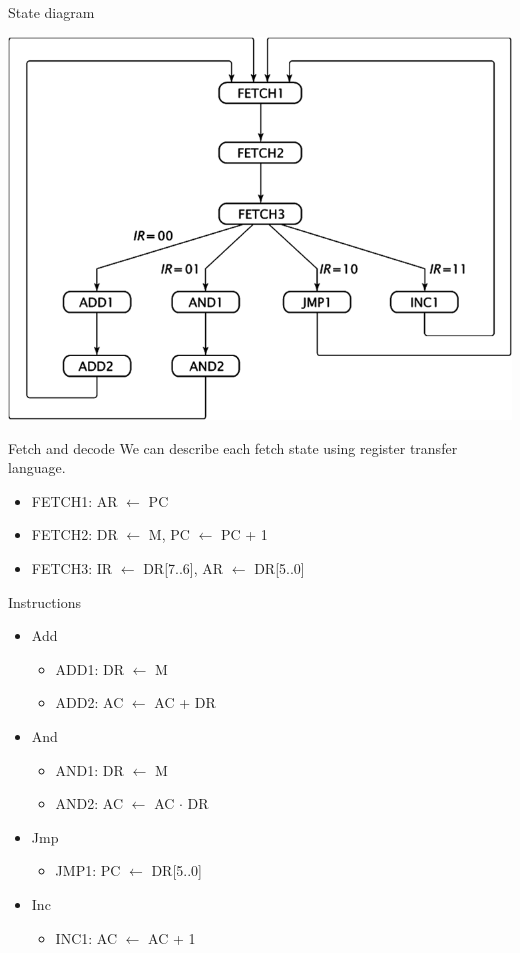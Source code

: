 \begin{frame}{State diagram}
  \begin{center}
    \includegraphics[scale=0.4]{StateDiagram}
  \end{center}
\end{frame}

\begin{frame}{Fetch and decode}
  We can describe each fetch state using register transfer language.
  \begin{itemize}
    \item FETCH1: AR $\leftarrow$ PC
    \item FETCH2: DR $\leftarrow$ M, PC $\leftarrow$ PC + 1
    \item FETCH3: IR $\leftarrow$ DR[7..6], AR $\leftarrow$ DR[5..0]
  \end{itemize}
\end{frame}

\begin{frame}{Instructions}
  \begin{itemize}
    \item Add
    \begin{itemize}
      \item ADD1: DR $\leftarrow$ M
      \item ADD2: AC $\leftarrow$ AC + DR
    \end{itemize}
    \item And
    \begin{itemize}
      \item AND1: DR $\leftarrow$ M
      \item AND2: AC $\leftarrow$ AC $\cdot$ DR
    \end{itemize}
    \item Jmp
    \begin{itemize}
      \item JMP1: PC $\leftarrow$ DR[5..0]
    \end{itemize}
    \item Inc
    \begin{itemize}
      \item INC1: AC $\leftarrow$ AC + 1
    \end{itemize}
  \end{itemize}
\end{frame}

